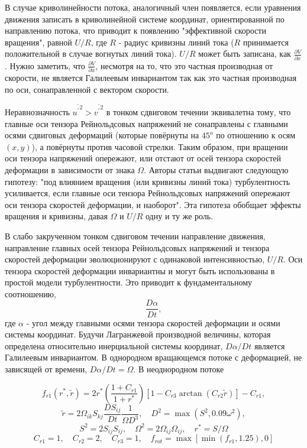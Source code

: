 		В случае криволинейности потока, аналогичный член появляется, если уравнения движения записать в криволинейной системе координат, ориентированной по направлению потока, что приводит к появлению "эффективной скорости вращения", равной $U/R$, где $R$ - радиус кривизны линий тока ($R$ принимается положительной в случае вогнутых линий тока). $U/R$ может быть записана, как $\frac{\partial V}{\partial x}$. Нужно заметить, что $\frac{\partial V}{\partial x}$, несмотря на то, что это частная производная от скорости, не является Галилеевым инвариантом так как это частная производная по оси, сонаправленной с вектором скорости.
		
		Неравнозначность $\overline{{u^{'}}^2} > \overline{{v^{'}}^2}$ в тонком сдвиговом течении эквивалетна тому, что главные оси тензора Рейнольдсовых напряжений не сонаправлены с главными осями сдвиговых деформаций (которые повёрнуты на $45^o$ по отношению к осям $(x, y)$), а повёрнуты против часовой стрелки. Таким образом, при вращении оси тензора напряжений опережают, или отстают от осей тензора скоростей деформации в зависимости от знака $\Omega$. Авторы статьи выдвигают следующую гипотезу: "под влиянием вращения (или кривизны линий тока) турбулентность усиливается, если главные оси тензора Рейнольдсовых напряжений опережают оси тензора скоростей деформации, и наоборот". Эта гипотеза обобщает эффекты вращения и кривизны, давая $\Omega$ и $U/R$ одну и ту же роль. 
		
		В слабо закрученном тонком сдвиговом течении направление движения, направление главных осей тензора Рейнольдсовых напряжений и тензора скоростей деформации эволюционируют с одинаковой интенсивностью, $U/R$. Оси тензора скоростей деформации инвариантны и могут быть использованы в простой модели турбулентности. Это приводит к фундаментальному соотношению, 
		$$
			\frac{D\alpha}{Dt},
		$$
		где $\alpha$ - угол между главными осями тензора скоростей деформации и осями системы координат. Будучи Лагранжевой производной величины, которая определена относительно инерциальной системы координат, $D\alpha/Dt$ является Галилеевым инвариантом. В однородном вращающемся потоке с деформацией, не зависящей от времени, $D\alpha/Dt = \Omega$. В неоднородном потоке 
		
		
		\begin{equation}
				f_{r1}(r^*,\tilde{r}) = 2r^*\left( \frac{1+C_{r1}}{1+ r^*} \right)\left[ 1-C_{r3}\arctan{(C_{r2}\tilde{r})} \right] - C_{r1},
		\end{equation}
		\begin{equation}
				\tilde{r} = 2\Omega_{ik}S_{kj}\frac{DS_{ij}}{Dt}\frac{1}{\Omega D^3}, \quad D^2 = \max(S^2, 0.09 \omega^2),
		\end{equation}
		$$
				S^2 = 2 S_{ij}S_{ij}, \quad \Omega^2 = 2 \Omega_{ij} \Omega_{ij}, \quad r^* = S/\Omega
		$$
		$$
				C_{r1} = 1, \quad C_{r2} = 2, \quad C_{r3} = 1, \quad f_{rot} = \max[\min(f_{r1},1.25),0]
		$$
